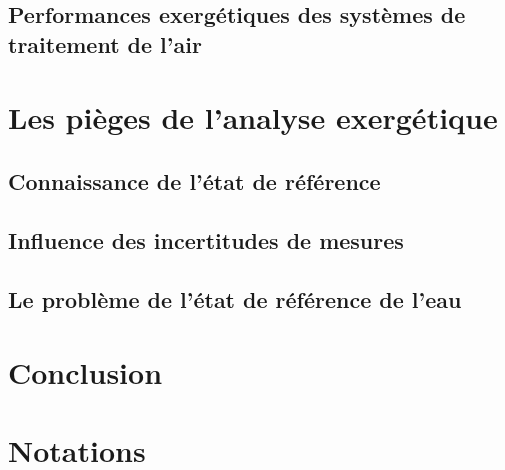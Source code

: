 \documentclass[a4paper,11pt]{scrartcl}
\begin{document}


\subsection{Performances exergétiques des systèmes de traitement de l'air}

\section{Les pièges de l'analyse exergétique}

\subsection{Connaissance de l'état de référence}

\subsection{Influence des incertitudes de mesures}

\subsection{Le problème de l'état de référence de l'eau}

\section{Conclusion}

\section*{Notations} \label{table-notations}
\end{document}
